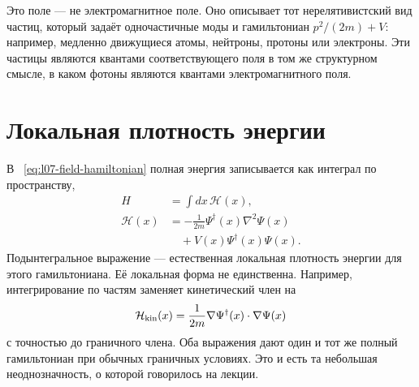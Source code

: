 Это поле — не электромагнитное поле. Оно описывает тот нерелятивистский вид частиц, который задаёт одночастичные моды и гамильтониан \(p^2/(2m)+V\): например, медленно движущиеся атомы, нейтроны, протоны или электроны. Эти частицы являются квантами соответствующего поля в том же структурном смысле, в каком фотоны являются квантами электромагнитного поля.

\begin{classroomqa}
\end{classroomqa}

\section{Локальная плотность энергии}

В ~\eqref{eq:l07-field-hamiltonian} полная энергия записывается как интеграл по пространству,
\begin{equation}
\begin{aligned}
H&=\int dx\,\mathcal H(x),\\
\mathcal H(x)
&=-\frac{1}{2m}\Psi^\dagger(x)\nabla^2\Psi(x)\\
&\quad+V(x)\Psi^\dagger(x)\Psi(x).
\end{aligned}
\label{eq:l07-hamiltonian-density}
\end{equation}
Подынтегральное выражение — естественная локальная плотность энергии для этого гамильтониана. Её локальная форма не единственна. Например, интегрирование по частям заменяет кинетический член на
\begin{equation}
\mathcal H_{\rm kin}(x)
=\frac{1}{2m}\nabla\Psi^\dagger(x)\mathbin{\cdot}\nabla\Psi(x)
\label{eq:l07-kinetic-density}
\end{equation}
с точностью до граничного члена. Оба выражения дают один и тот же полный гамильтониан при обычных граничных условиях. Это и есть та небольшая неоднозначность, о которой говорилось на лекции.

\begin{classroomqa}
\end{classroomqa}

